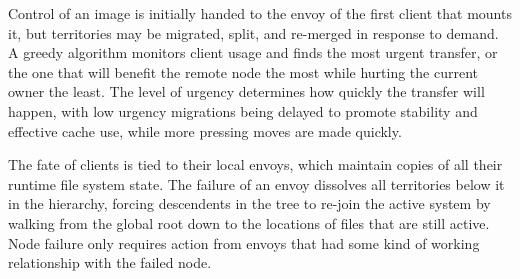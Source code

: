 Control of an image is initially handed to the envoy of the first client that mounts it, but territories may be migrated, split, and re-merged in response to demand. A greedy algorithm monitors client usage and finds the most urgent transfer, or the one that will benefit the remote node the most while hurting the current owner the least. The level of urgency determines how quickly the transfer will happen, with low urgency migrations being delayed to promote stability and effective cache use, while more pressing moves are made quickly.

The fate of clients is tied to their local envoys, which maintain copies of all their runtime file system state. The failure of an envoy dissolves all territories below it in the hierarchy, forcing descendents in the tree to re-join the active system by walking from the global root down to the locations of files that are still active. Node failure only requires action from envoys that had some kind of working relationship with the failed node.
